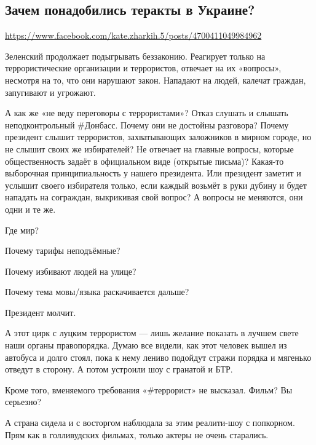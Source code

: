  
 
 
 
 

\subsection{Зачем понадобились теракты в Украине?}
\url{https://www.facebook.com/kate.zharkih.5/posts/4700411049984962}

Зеленский продолжает подыгрывать беззаконию. Реагирует только на
террористические организации и террористов, отвечает на их «вопросы», несмотря
на то, что они нарушают закон. Нападают на людей, калечат граждан, запугивают и
угрожают.

А как же «не веду переговоры с террористами»?  Отказ слушать и слышать
неподконтрольный #Донбасс. Почему они не достойны разговора? Почему президент
слышит террористов, захватывающих заложников в мирном городе, но не слышит
своих же избирателей? Не отвечает на главные вопросы, которые общественность
задаёт в официальном виде (открытые письма)? Какая-то выборочная
принципиальность у нашего президента. Или президент заметит и услышит своего
избирателя только, если каждый возьмёт в руки дубину и будет нападать на
сограждан, выкрикивая свой вопрос? А вопросы не меняются, они одни и те же.

Где мир?

Почему тарифы неподъёмные?

Почему избивают людей на улице?

Почему тема мовы/языка раскачивается дальше?

Президент молчит.

А этот цирк с луцким террористом — лишь желание показать в лучшем свете наши органы правопорядка. Думаю все видели, как этот человек вышел из автобуса и долго стоял, пока к нему лениво подойдут стражи порядка и мягенько отведут в сторону. А потом устроили шоу с гранатой и БТР.

Кроме того, вменяемого требования «#террорист» не высказал. Фильм? Вы серьезно?

А страна сидела и с восторгом наблюдала за этим реалити-шоу с попкорном. Прям как в голливудских фильмах, только актеры не очень старались.

